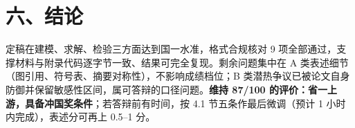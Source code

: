 \documentclass[12pt,a4paper]{ctexart}
\begin{document}
\section{六、结论}

定稿在建模、求解、检验三方面达到国一水准，格式合规核对 9 项全部通过，支撑材料与附录代码逐字节一致、结果可完全复现。剩余问题集中在 A 类表述细节（图引用、符号表、摘要对称性），不影响成绩档位；B 类潜热争议已被论文自身防御并保留敏感性区间，属可答辩的口径问题。\textbf{维持 87/100 的评价：省一上游，具备冲国奖条件}；若答辩前有时间，按 4.1 节五条作最后微调（预计 1 小时内完成），表述分可再上 0.5--1 分。
\end{document}
